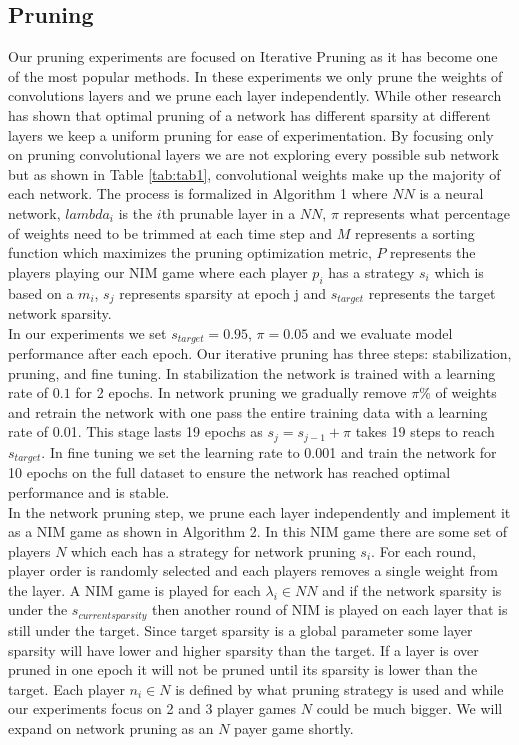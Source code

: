\documentclass[11pt]{article}
\begin{document}
\subsection{Pruning}
Our pruning experiments are focused on Iterative Pruning as it has become one of the most popular methods. In these experiments we only prune the weights of convolutions layers and we prune each layer independently. While other research has shown that optimal pruning of a network has different sparsity at different layers \cite{Blalock2020WhatIT} we keep a uniform pruning for ease of experimentation. By focusing only on pruning convolutional layers we are not exploring every possible sub network but as shown in Table \ref{tab:tab1}, convolutional weights make up the majority of each network. The process is formalized in Algorithm 1 where $NN$ is a neural network, $lambda_i$ is the $i$th prunable layer in a $NN$, $\pi$ represents what percentage of weights need to be trimmed at each time step and $M$ represents a sorting function which maximizes the pruning optimization metric, $P$ represents the players playing our NIM game where each player $p_i$ has a strategy $s_i$ which is based on a $m_i$, $s_j$ represents sparsity at epoch j and $s_{target}$ represents the target network sparsity. \\
In our experiments we set $s_{target} = 0.95$, $\pi=0.05$ and we evaluate model performance after each epoch. Our iterative pruning has three steps: stabilization, pruning, and fine tuning. In stabilization the network is trained with a learning rate of $0.1$ for 2 epochs. In network pruning we gradually remove $\pi\%$ of  weights and retrain the network with one pass the entire training data with a learning rate of 0.01. This stage lasts 19 epochs as $s_j = s_{j-1} + \pi$ takes 19 steps to reach $s_{target}$. In fine tuning we set the learning rate to 0.001 and train the network for 10 epochs on the full dataset to ensure the network has reached optimal performance and is stable. \\
In the network pruning step, we prune each layer independently and implement it as a NIM game as shown in Algorithm 2. In this NIM game there are some set of players $N$ which each has a strategy for network pruning $s_i$. For each round, player order is randomly selected and each players removes a single weight from the layer. A NIM game is played for each $\lambda_i \in NN$ and if the network sparsity is under the $s_{current sparsity}$ then another round of NIM is played on each layer that is still under the target. Since target sparsity is a global parameter some layer sparsity will have lower and higher sparsity than the target. If a layer is over pruned in one epoch it will not be pruned until its sparsity is lower than the target.  Each player $n_i \in N$ is defined by what pruning strategy is used and while our experiments focus on 2 and 3 player games $N$ could be much bigger. We will expand on network pruning as an $N$ payer game shortly.
\end{document}
